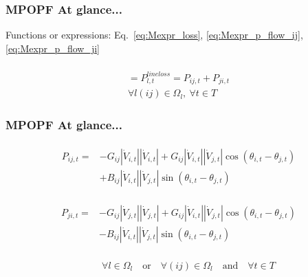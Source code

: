 \documentclass[
	11pt, %
	aspectratio=169, %
]{beamer}
\begin{document}

\begin{frame}
	\frametitle{MPOPF At glance...}

	Functions or expressions: Eq.~\eqref{eq:Mexpr_loss}, \eqref{eq:Mexpr_p_flow_ij}, \eqref{eq:Mexpr_p_flow_ji}

	\begin{gather*}
		[-G_{ij}(\left|\dot{V}_{i,t} \right|^2 + \left|\dot{V}_{j,t} \right|^2) + 2G_{ij}\left|\dot{V}_{i,t} \right|\left|\dot{V}_{j,t} \right|\cos\left(\theta_{i,t}-\theta_{j,t} \right) ] \\
		= P_{l,t}^{line loss} = P_{ij,t} + P_{ji,t} \\[1em]
		\forall l(ij) \in \Omega_{l},\ \forall t \in T
	\end{gather*}

	
\end{frame}


\begin{frame}
	\frametitle{MPOPF At glance...}

	\begin{align*}
		\begin{split}
		P_{ij,t} = &-G_{ij} \left|\dot{V}_{i,t} \right| \left|\dot{V}_{i,t} \right| 
		+ G_{ij} \left|\dot{V}_{i,t} \right| \left|\dot{V}_{j,t} \right| \cos\left(\theta_{i,t}-\theta_{j,t} \right) \\
		&+ B_{ij} \left|\dot{V}_{i,t} \right| \left|\dot{V}_{j,t} \right| \sin\left(\theta_{i,t}-\theta_{j,t} \right) 
		\end{split}
	\end{align*}

	\begin{align*}
		\begin{split}
		P_{ji,t}=&-G_{ij} \left|\dot{V}_{j,t} \right| \left|\dot{V}_{j,t} \right| 
		+ G_{ij} \left|\dot{V}_{i,t} \right| \left|\dot{V}_{j,t} \right| \cos\left(\theta_{i,t}-\theta_{j,t} \right)\\
		&- B_{ij} \left|\dot{V}_{i,t} \right| \left|\dot{V}_{j,t} \right| \sin\left(\theta_{i,t}-\theta_{j,t} \right)
		\end{split}
	\end{align*}

	\begin{align*}
		\begin{split}
		\quad \quad \forall l \in \Omega_{l} \quad \text{or} \quad \forall (ij) \in \Omega_{l} \quad \text{and} \quad \forall t \in T
		\end{split}
	\end{align*}

	
\end{frame}
\end{document}
